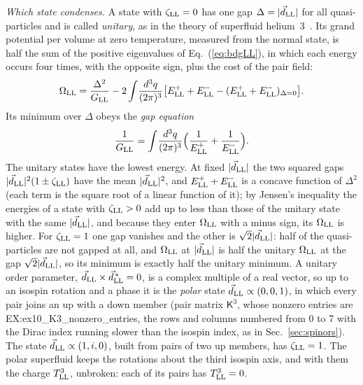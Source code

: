 \documentclass[aps,prd,twocolumn,superscriptaddress,nofootinbib,floatfix,longbibliography]{revtex4-2}
\newcommand{\LL}{{\rm LL}}
\begin{document}
\emph{Which state condenses.} A state with $\zeta_\LL=0$ has one gap $\Delta=|\vec d_\LL|$ for all quasi-particles and is
called \emph{unitary}, as in the theory of superfluid helium~3~\cite{BalianWerthamer1963,Leggett1975}. Its grand potential
per volume at zero temperature, measured from the normal state, is half the sum of the positive eigenvalues of
Eq.~(\ref{eq:bdgLL}), in which each energy occurs four times, with the opposite sign, plus the cost of the pair field:
\begin{equation}
\Omega_\LL=\frac{\Delta^2}{G_\LL}-2\int\!\frac{d^3q}{(2\pi)^3}\big[E^+_\LL+E^-_\LL-(E^+_\LL+E^-_\LL)_{\Delta=0}\big].
\label{eq:omegaLL}
\end{equation}
Its minimum over $\Delta$ obeys the \emph{gap equation}
\begin{equation}
\frac1{G_\LL}=\int\!\frac{d^3q}{(2\pi)^3}\Big(\frac1{E^+_\LL}+\frac1{E^-_\LL}\Big).
\label{eq:gapLL}
\end{equation}
The unitary states have the lowest energy. At fixed $|\vec d_\LL|$ the two squared gaps $|\vec d_\LL|^2(1\pm\zeta_\LL)$ have
the mean $|\vec d_\LL|^2$, and $E^+_\LL+E^-_\LL$ is a concave function of $\Delta^2$ (each term is the square root of a
linear function of it); by Jensen's inequality the energies of a state with $\zeta_\LL>0$ add up to less than those of the
unitary state with the same $|\vec d_\LL|$, and because they enter $\Omega_\LL$ with a minus sign, its $\Omega_\LL$ is
higher. For $\zeta_\LL=1$ one gap vanishes and the other is $\sqrt2|\vec d_\LL|$: half of the quasi-particles are not
gapped at all, and $\Omega_\LL$ at $|\vec d_\LL|$ is half the unitary $\Omega_\LL$ at the gap $\sqrt2|\vec d_\LL|$, so its
minimum is exactly half the unitary minimum. A unitary order parameter, $\vec d_\LL\times\vec d^{\,*}_\LL=0$, is a complex
multiple of a real vector, so up to an isospin rotation and a phase it is the \emph{polar} state $\vec
d_\LL\propto(0,0,1)$, in which every pair joins an up with a down member (pair matrix $\mathsf K^3$, whose nonzero entries
are {{EX:ex10_K3_nonzero_entries}}, the rows and columns numbered from 0 to 7 with the Dirac index running slower than the
isospin index, as in Sec.~\ref{sec:spinors}). The state $\vec d_\LL\propto(1,i,0)$, built from pairs of two up members,
has $\zeta_\LL=1$. The polar superfluid keeps the rotations about the third isospin axis, and with them the charge
$T^3_\LL$, unbroken: each of its pairs has $T^3_\LL=0$.
\end{document}
